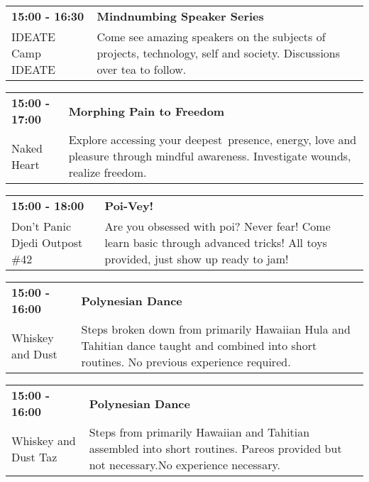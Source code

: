 \begin{tabular}{ p{1in} p{2.2in} }
    \textbf{15:00 - 16:30} & \textbf{ Mindnumbing Speaker Series} \\
    IDEATE \newline Camp IDEATE & Come see amazing speakers on the subjects of projects, technology, self and society. Discussions over tea to follow. \\
    \hline 
\end{tabular}
    
\begin{tabular}{ p{1in} p{2.2in} }
    \textbf{15:00 - 17:00} & \textbf{Morphing Pain to Freedom} \\
    Naked Heart \newline  & Explore accessing your deepest~presence, energy, love and pleasure through mindful awareness. Investigate wounds, realize freedom. \\
    \hline 
\end{tabular}
    
\begin{tabular}{ p{1in} p{2.2in} }
    \textbf{15:00 - 18:00} & \textbf{Poi-Vey!} \\
    Don't Panic Djedi Outpost \#42 \newline  & Are you obsessed with poi? Never fear! Come learn basic through advanced tricks! All toys provided, just show up ready to jam! \\
    \hline 
\end{tabular}
    
\begin{tabular}{ p{1in} p{2.2in} }
    \textbf{15:00 - 16:00} & \textbf{Polynesian Dance} \\
    Whiskey and Dust \newline  & Steps broken down from primarily Hawaiian Hula and Tahitian dance taught and combined into short routines. No previous experience required. \\
    \hline 
\end{tabular}
    
\begin{tabular}{ p{1in} p{2.2in} }
    \textbf{15:00 - 16:00} & \textbf{Polynesian Dance} \\
    Whiskey and Dust \newline Taz & Steps from primarily Hawaiian and Tahitian assembled into short routines.  Pareos provided but not necessary.No experience necessary. \\
    \hline 
\end{tabular}
    
